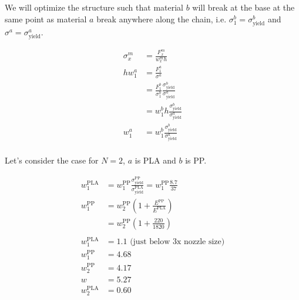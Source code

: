 We will optimize the structure such that material $b$ will break at the base at the same point as material $a$ break anywhere along the chain, i.e. $\sigma^b_1 = \sigma^b_\text{yield}$ and $\sigma^a  = \sigma^a_\text{yield}$.

\begin{align*}
	\sigma_x^m &= \frac{F_x^m}{w_x^m h}\\
	h w_1^a &= \frac{F_1^a}{\sigma^a} \\
	&= \frac{F_1^b}{\sigma_1^b} \frac{\sigma^b_\text{yield}}{\sigma^a_\text{yield}}\\
	&= w_1^b h \frac{\sigma^b_\text{yield}}{\sigma^a_\text{yield}}\\
	w_1^a &= w_1^b \frac{\sigma^b_\text{yield}}{\sigma^a_\text{yield}}\\
\end{align*}


Let's consider the case for $N=2$, $a$ is PLA and $b$ is PP.

\begin{align*}
	w_1^\text{PLA} &= w_1^\text{PP} \frac{\sigma^\text{PP}_\text{yield}}{\sigma^\text{PLA}_\text{yield}} = w_1^\text{PP} \frac{8.7}{37} \\
	w^\text{PP}_1 &=  w_2^\text{PP} \left( 1 + \frac{E^\text{PP}}{E^\text{PLA}}  \right) \\
	&=  w_2^\text{PP} \left( 1 + \frac{220}{1820}  \right) \\
	\\
	w_1^\text{PLA} &= 1.1 \text{ (just below 3x nozzle size)}\\
	w_1^\text{PP} &= 4.68 \\
	w_2^\text{PP} &= 4.17 \\
	w &= 5.27 \\
	w_2^\text{PLA} &= 0.60 \\
\end{align*}

